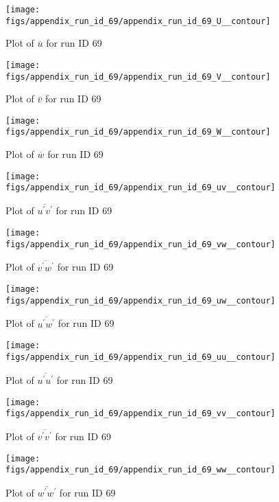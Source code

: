\begin{figure}[H]
\centering
\texttt{[image: figs/appendix\_run\_id\_69/appendix\_run\_id\_69\_U\_\_contour]}
\caption{Plot of $\overline{u}$ for run ID 69}
\label{fig:appendix_run_id_69_U__contour}
\end{figure}


\begin{figure}[H]
\centering
\texttt{[image: figs/appendix\_run\_id\_69/appendix\_run\_id\_69\_V\_\_contour]}
\caption{Plot of $\overline{v}$ for run ID 69}
\label{fig:appendix_run_id_69_V__contour}
\end{figure}


\begin{figure}[H]
\centering
\texttt{[image: figs/appendix\_run\_id\_69/appendix\_run\_id\_69\_W\_\_contour]}
\caption{Plot of $\overline{w}$ for run ID 69}
\label{fig:appendix_run_id_69_W__contour}
\end{figure}


\begin{figure}[H]
\centering
\texttt{[image: figs/appendix\_run\_id\_69/appendix\_run\_id\_69\_uv\_\_contour]}
\caption{Plot of $\overline{u^\prime v^\prime}$ for run ID 69}
\label{fig:appendix_run_id_69_uv__contour}
\end{figure}


\begin{figure}[H]
\centering
\texttt{[image: figs/appendix\_run\_id\_69/appendix\_run\_id\_69\_vw\_\_contour]}
\caption{Plot of $\overline{v^\prime w^\prime}$ for run ID 69}
\label{fig:appendix_run_id_69_vw__contour}
\end{figure}


\begin{figure}[H]
\centering
\texttt{[image: figs/appendix\_run\_id\_69/appendix\_run\_id\_69\_uw\_\_contour]}
\caption{Plot of $\overline{u^\prime w^\prime}$ for run ID 69}
\label{fig:appendix_run_id_69_uw__contour}
\end{figure}


\begin{figure}[H]
\centering
\texttt{[image: figs/appendix\_run\_id\_69/appendix\_run\_id\_69\_uu\_\_contour]}
\caption{Plot of $\overline{u^\prime u^\prime}$ for run ID 69}
\label{fig:appendix_run_id_69_uu__contour}
\end{figure}


\begin{figure}[H]
\centering
\texttt{[image: figs/appendix\_run\_id\_69/appendix\_run\_id\_69\_vv\_\_contour]}
\caption{Plot of $\overline{v^\prime v^\prime}$ for run ID 69}
\label{fig:appendix_run_id_69_vv__contour}
\end{figure}


\begin{figure}[H]
\centering
\texttt{[image: figs/appendix\_run\_id\_69/appendix\_run\_id\_69\_ww\_\_contour]}
\caption{Plot of $\overline{w^\prime w^\prime}$ for run ID 69}
\label{fig:appendix_run_id_69_ww__contour}
\end{figure}


